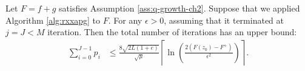 \documentclass[12pt]{report}
\begin{document}
        \begin{theorem}\label{thm:rxxapg-total-itr-bnds}
            Let $F = f + g$ satisfies Assumption \ref{ass:q-growth-ch2}. 
            Suppose that we applied Algorithm \ref{alg:rxxapg} to $F$. 
            For any $\epsilon > 0$, assuming that it terminated at $j = J < M$ iteration.
            Then the total number of iterations has an upper bound:
            \begin{align*}
                \sum_{i = 0}^{J - 1}p_i &\le 
                \frac{8\sqrt{2L(1 + e)}}{\sqrt{\mu}} \left\lceil 
                \ln \left(
                    \frac{2(F(z_0) - F^+)}{\epsilon^2}
                \right) 
                \right\rceil. 
            \end{align*}
        \end{theorem}
\end{document}
